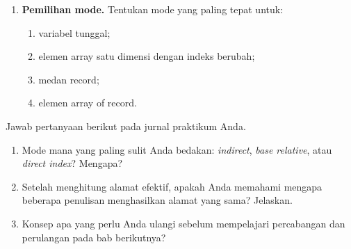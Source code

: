 \begin{enumerate}
    \item \textbf{Pemilihan mode.} Tentukan mode yang paling tepat
          untuk:
          \begin{enumerate}
              \item variabel tunggal;
              \item elemen array satu dimensi dengan indeks berubah;
              \item medan record;
              \item elemen array of record.
          \end{enumerate}
\end{enumerate}

\begin{refleksibox}
\vspace{1.1em}
Jawab pertanyaan berikut pada jurnal praktikum Anda.
\begin{enumerate}
    \item Mode mana yang paling sulit Anda bedakan: \textit{indirect},
          \textit{base relative}, atau \textit{direct index}?
          Mengapa?
    \item Setelah menghitung alamat efektif, apakah Anda memahami
          mengapa beberapa penulisan menghasilkan alamat yang sama?
          Jelaskan.
    \item Konsep apa yang perlu Anda ulangi sebelum mempelajari
          percabangan dan perulangan pada bab berikutnya?
\end{enumerate}
\end{refleksibox}
